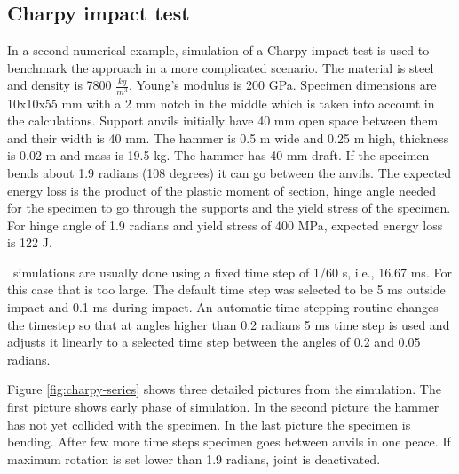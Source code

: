 \subsection{Charpy impact test}
In a second numerical example, simulation of a Charpy impact test is
used to benchmark the approach in a more complicated scenario. 
The material is steel and density is 7800 $\frac{kg}{m^{3}}$. Young’s modulus is 200 GPa.
Specimen dimensions are 10x10x55 mm with a 2 mm notch in the middle which is taken into account in the calculations.
Support anvils initially have 40 mm open space between them and their width is 40 mm. 
The hammer is 0.5 m wide and 0.25 m high, thickness is 0.02 m and mass is 19.5 kg.
The hammer has 40 mm draft.
If the specimen bends about 1.9 radians (108 degrees) it can go between the anvils.
The expected energy loss is the product of the plastic moment of section, 
hinge angle needed for the specimen to go through the supports and 
the yield stress of the specimen. For hinge angle of 1.9 radians and yield stress of 400 MPa, expected energy 
loss is 122 J.

\cbullet\ simulations are usually done using a fixed time step of 1/60 s, i.e., 16.67 ms. 
For this case that is too large. 
The default time step was selected to be 5 ms outside impact  and 0.1 ms during impact. 
An automatic time stepping routine changes the timestep so that at angles higher than 0.2 radians 5 ms time step is
used and adjusts it linearly to a selected time step between the angles of 0.2 and 0.05 radians.

Figure \ref{fig:charpy-series} shows three detailed pictures from the simulation.
The first picture shows early phase of simulation. 
In the second picture the hammer has not yet collided with the specimen.
In the last picture the specimen is bending. 
After few more time steps specimen goes between anvils in one peace.
If maximum rotation is set lower than 1.9 radians, joint is deactivated.


